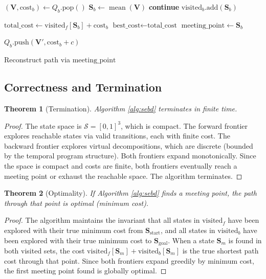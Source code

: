 \documentclass[twocolumn,11pt,a4paper]{article}
\newtheorem{theorem}{Theorem}[section]
\newcommand{\Stuple}{\mathbf{S}}
\newcommand{\calS}{\mathcal{S}}
\DeclareMathOperator{\mean}{mean}
\begin{document}
\begin{algorithm}
\begin{algorithmic}[1]
    \State $(\mathbf{V}, \text{cost}_b) \gets Q_b.\text{pop}()$ 
    \State $\Stuple_b \gets \mean(\mathbf{V})$
    \If{$\Stuple_b \in \text{visited}_b$} \textbf{continue} \EndIf
    \State $\text{visited}_b.\text{add}(\Stuple_b)$

    \If{$\Stuple_b \in \text{visited}_f$}
      \State $\text{total\_cost} \gets \text{visited}_f[\Stuple_b] + \text{cost}_b$
        \State $\text{best\_cost} \gets \text{total\_cost}$
        \State $\text{meeting\_point} \gets \Stuple_b$
      \EndIf
    \EndIf

      \State $Q_b.\text{push}(\mathbf{V}', \text{cost}_b + c)$
    \EndFor
  \EndIf
\EndWhile

\Return Reconstruct path via $\text{meeting\_point}$
\end{algorithmic}
\end{algorithm}

\subsection{Correctness and Termination}

\begin{theorem}[Termination]
Algorithm \ref{alg:sebd} terminates in finite time.
\end{theorem}

\begin{proof}
The state space is $\calS = [0,1]^3$, which is compact. The forward frontier explores reachable states via valid transitions, each with finite cost. The backward frontier explores virtual decompositions, which are discrete (bounded by the temporal program structure). Both frontiers expand monotonically. Since the space is compact and costs are finite, both frontiers eventually reach a meeting point or exhaust the reachable space. The algorithm terminates.
\end{proof}

\begin{theorem}[Optimality]
If Algorithm \ref{alg:sebd} finds a meeting point, the path through that point is optimal (minimum cost).
\end{theorem}

\begin{proof}
The algorithm maintains the invariant that all states in $\text{visited}_f$ have been explored with their true minimum cost from $\Stuple_{\text{start}}$, and all states in $\text{visited}_b$ have been explored with their true minimum cost to $\Stuple_{\text{goal}}$. When a state $\Stuple_m$ is found in both visited sets, the cost $\text{visited}_f[\Stuple_m] + \text{visited}_b[\Stuple_m]$ is the true shortest path cost through that point. Since both frontiers expand greedily by minimum cost, the first meeting point found is globally optimal.
\end{proof}
\end{document}
